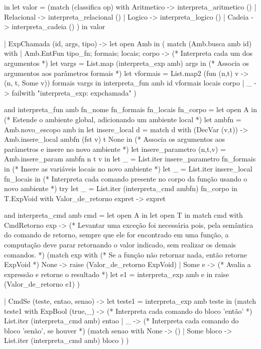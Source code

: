 \documentclass[12pt,a4paper,twoside]{article}
\begin{document}
\begin{terminal}
    in
    let valor = (match (classifica op) with
          Aritmetico -> interpreta_aritmetico ()
        | Relacional -> interpreta_relacional ()
        | Logico -> interpreta_logico ()
        | Cadeia -> interpreta_cadeia ()
      )
    in
      valor

  | ExpChamada (id, args, tipo) ->
    let open Amb in
    ( match (Amb.busca amb id) with
      | Amb.EntFun {tipo_fn; formais; locais; corpo} ->
           (* Interpreta cada um dos argumentos *)
           let vargs = List.map (interpreta_exp amb) args in
           (* Associa os argumentos aos parâmetros formais *)
           let vformais = List.map2 (fun (n,t) v -> (n, t, Some v)) formais vargs
           in interpreta_fun amb id vformais locais corpo
      | _ -> failwith "interpreta_exp: expchamada"
    )

and interpreta_fun amb fn_nome fn_formais fn_locais fn_corpo =
  let open A in
 (* Estende o ambiente global, adicionando um ambiente local *)
  let ambfn = Amb.novo_escopo amb in
   let insere_local  d =
    match d with
      (DecVar (v,t)) -> Amb.insere_local ambfn (fst v)  t None
  in
  (* Associa os argumentos aos parâmetros e insere no novo ambiente *)
  let insere_parametro (n,t,v) = Amb.insere_param ambfn n t v in
  let _ = List.iter insere_parametro fn_formais in
  (* Insere as variáveis locais no novo ambiente *)
    let _ = List.iter insere_local fn_locais in
    (* Interpreta cada comando presente no corpo da função usando o novo
       ambiente *)
  try
    let _ = List.iter (interpreta_cmd ambfn) fn_corpo in T.ExpVoid
    with
       Valor_de_retorno expret -> expret

and interpreta_cmd amb cmd =
  let open A in
  let open T in
  match cmd with
    CmdRetorno exp ->
    (* Levantar uma exceção foi necessária pois, pela semântica do comando de
        retorno, sempre que ele for encontrado em uma função, a computação
        deve parar retornando o valor indicado, sem realizar os demais comandos.
    *)
    (match exp with
     (* Se a função não retornar nada, então retorne ExpVoid *)
       None -> raise (Valor_de_retorno ExpVoid)
     | Some e ->
       (* Avalia a expressão e retorne o resultado *)
       let e1 = interpreta_exp amb e in
       raise (Valor_de_retorno e1)
    )

  | CmdSe (teste, entao, senao) ->
    let teste1 = interpreta_exp amb teste in
    (match teste1 with
       ExpBool (true,_) ->
       (* Interpreta cada comando do bloco 'então' *)
       List.iter (interpreta_cmd amb) entao
     | _ ->
       (* Interpreta cada comando do bloco 'senão', se houver *)
       (match senao with
          None -> ()
        | Some bloco -> List.iter (interpreta_cmd amb) bloco
       )
    )


\end{terminal}
\end{document}
